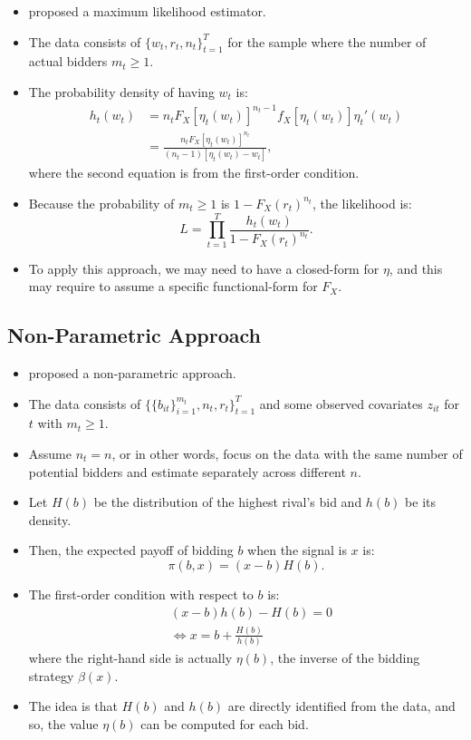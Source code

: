 \documentclass[
]{book}
\providecommand{\tightlist}{%
  \setlength{\itemsep}{0pt}\setlength{\parskip}{0pt}}
\begin{document}
\begin{itemize}
\item
  \citet{donaldPiecewisePseudoMaximumLikelihood1993} proposed a maximum likelihood estimator.
\item
  The data consists of \(\{w_t, r_t, n_t\}_{t = 1}^T\) for the sample where the number of actual bidders \(m_t \ge 1\).
\item
  The probability density of having \(w_t\) is:
  \[
  \begin{split}
  h_t(w_t) &= n_t F_X[\eta_t(w_t)]^{n_t - 1} f_X[\eta_t(w_t)] \eta_t'(w_t)\\
  &= \frac{n_t F_X[\eta_t(w_t)]^{n_t}}{(n_t - 1)[\eta_t(w_t) - w_t]},
  \end{split}
  \]
  where the second equation is from the first-order condition.
\item
  Because the probability of \(m_t \ge 1\) is \(1 - F_X(r_t)^{n_t}\), the likelihood is:
  \[
  L = \prod_{t = 1}^T \frac{h_t(w_t)}{1 - F_X(r_t)^{n_t}}.
  \]
\item
  To apply this approach, we may need to have a closed-form for \(\eta\), and this may require to assume a specific functional-form for \(F_X\).
\end{itemize}

\hypertarget{non-parametric-approach}{%
\subsection{Non-Parametric Approach}\label{non-parametric-approach}}

\begin{itemize}
\tightlist
\item
  \citet{guerreOptimalNonparametricEstimation2000} proposed a non-parametric approach.
\item
  The data consists of \(\{\{b_{it}\}_{i = 1}^{m_t}, n_t, r_t\}_{t = 1}^T\) and some observed covariates \(z_{it}\) for \(t\) with \(m_t \ge 1\).
\item
  Assume \(n_t = n\), or in other words, focus on the data with the same number of potential bidders and estimate separately across different \(n\).
\item
  Let \(H(b)\) be the distribution of the highest rival's bid and \(h(b)\) be its density.
\item
  Then, the expected payoff of bidding \(b\) when the signal is \(x\) is:
  \[
  \pi(b, x) = (x - b) H(b).
  \]
\item
  The first-order condition with respect to \(b\) is:
  \[
  \begin{split}
  & (x - b) h(b) - H(b) = 0\\
  &\Leftrightarrow x = b + \frac{H(b)}{h(b)}
  \end{split}
  \]
  where the right-hand side is actually \(\eta(b)\), the inverse of the bidding strategy \(\beta(x)\).
\item
  The idea is that \(H(b)\) and \(h(b)\) are directly identified from the data, and so, the value \(\eta(b)\) can be computed for each bid.
\end{itemize}
\end{document}
